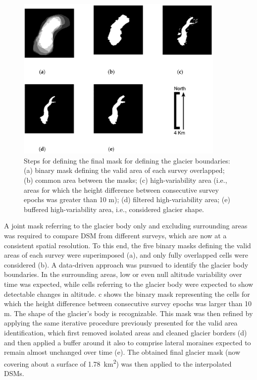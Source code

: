 \begin{figure}[ht]
    \centering
    \includegraphics[width=0.9\textwidth]{glacier_masks.png}
    \caption{Steps for defining the final mask for defining the glacier boundaries: (a) binary mask defining the valid area of each survey overlapped; (b) common area between the masks; (c) high-variability area (i.e., areas for which the height difference between consecutive survey epochs was greater than 10 m); (d) filtered high-variability area; (e) buffered high-variability area, i.e., considered glacier shape. }
    \label{fig:2:glacier_masks}
\end{figure}

A joint mask referring to the glacier body only and excluding surrounding areas was required to compare DSM from different surveys, which are now at a consistent spatial resolution.
To this end, the five binary masks defining the valid areas of each survey were superimposed (a), and only fully overlapped cells were considered (b).
A data-driven approach was pursued to identify the glacier body boundaries. 
In the surrounding areas, low or even null altitude variability over time was expected, while cells referring to the glacier body were expected to show detectable changes in altitude. 
c shows the binary mask representing the cells for which the height difference between consecutive survey epochs was larger than 10 m. 
The shape of the glacier's body is recognizable. 
This mask was then refined by applying the same iterative procedure previously presented for the valid area identification, which first removed isolated areas and cleaned glacier borders (d) and then applied a buffer around it also to comprise lateral moraines expected to remain almost unchanged over time (e). 
The obtained final glacier mask (now covering about a surface of \SI{1.78}{\kilo\meter\squared}) was then applied to the interpolated DSMs.

